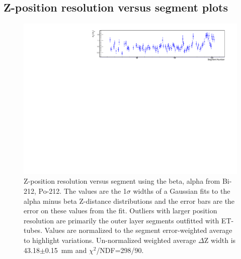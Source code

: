 \subsection{Z-position resolution versus segment plots}
\begin{figure}[!h]
\centering
\includegraphics[width=1.05\textwidth]{figures/PubBiPo212dZWidthvsCell.pdf}
\caption{\label{fig:ZresvsCell212}Z-position resolution versus segment using the beta, alpha from Bi-212, Po-212. The values are the 1$\sigma$ widths of a Gaussian fits to the alpha minus beta Z-distance distributions and the error bars are the error on these values from the fit. Outliers with larger position resolution are primarily the outer layer segments outfitted with ET-tubes. Values are normalized to the segment error-weighted average to highlight variations. Un-normalized weighted average $\Delta$Z width is 43.18$\pm$0.15~mm and $\chi^2$/NDF=298/90.}
\end{figure}

